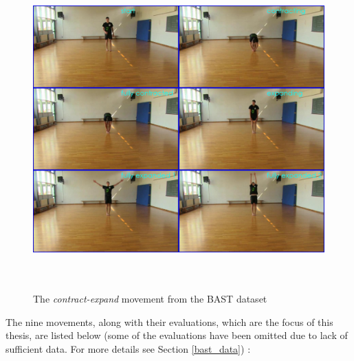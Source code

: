 \documentclass[extern,palatino]{cgMA}
\begin{document}
\begin{figure}[h]
\center
\includegraphics[height={350pt}, width={400pt}]{images/bast_contract_expand.jpg}
\caption{The \textit{contract-expand} movement from the BAST dataset}
\label{bast_contract_expand}
\end{figure}

The nine movements, along with their evaluations, which are the focus of this thesis, are listed below (some of the evaluations have been omitted due to lack of sufficient data. For more details see Section \ref{bast_data}) \cite{lausberg1994vergleichende}:
\end{document}

